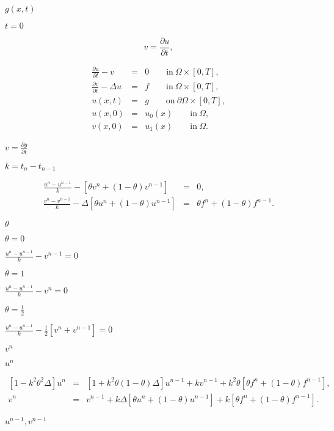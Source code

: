 \documentclass{article}
\begin{document}
$g(x,t)$
\pagebreak

$t=0$
\pagebreak

\[ v = \frac{\partial u}{\partial t}, \]
\pagebreak

\begin{eqnarray*} \frac{\partial u}{\partial t} - v &=& 0 \qquad \textrm{in}\ \Omega\times [0,T], \\ \frac{\partial v}{\partial t} - \Delta u &=& f \qquad \textrm{in}\ \Omega\times [0,T], \\ u(x,t) &=& g \qquad \textrm{on}\ \partial\Omega\times [0,T], \\ u(x,0) &=& u_0(x) \qquad \textrm{in}\ \Omega, \\ v(x,0) &=& u_1(x) \qquad \textrm{in}\ \Omega. \end{eqnarray*}
\pagebreak

$v=\frac{\partial g}{\partial t}$
\pagebreak

$k=t_n-t_{n-1}$
\pagebreak

\begin{eqnarray*} \frac{u^n - u^{n-1}}{k} - \left[\theta v^n + (1-\theta) v^{n-1}\right] &=& 0, \\ \frac{v^n - v^{n-1}}{k} - \Delta\left[\theta u^n + (1-\theta) u^{n-1}\right] &=& \theta f^n + (1-\theta) f^{n-1}. \end{eqnarray*}
\pagebreak

$\theta$
\pagebreak

$\theta=0$
\pagebreak

$\frac{u^n - u^{n-1}}{k} - v^{n-1} = 0$
\pagebreak

$\theta=1$
\pagebreak

$\frac{u^n - u^{n-1}}{k} - v^n = 0$
\pagebreak

$\theta=\frac 12$
\pagebreak

$\frac{u^n - u^{n-1}}{k} - \frac 12 \left[v^n + v^{n-1}\right] = 0$
\pagebreak

$v^n$
\pagebreak

$u^n$
\pagebreak

\begin{eqnarray*} \left[ 1-k^2\theta^2\Delta \right] u^n &=& \left[ 1+k^2\theta(1-\theta)\Delta\right] u^{n-1} + k v^{n-1} + k^2\theta\left[\theta f^n + (1-\theta) f^{n-1}\right],\\ v^n &=& v^{n-1} + k\Delta\left[ \theta u^n + (1-\theta) u^{n-1}\right] + k\left[\theta f^n + (1-\theta) f^{n-1}\right]. \end{eqnarray*}
\pagebreak

$u^{n-1},v^{n-1}$
\pagebreak
\end{document}
